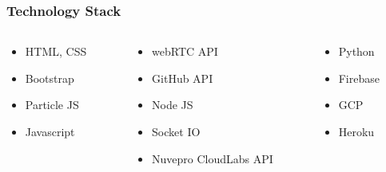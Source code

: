 \documentclass[14pt]{beamer}
\begin{document}
{
\begin{frame}
    \frametitle{\textcolor{whitegray}{Technology Stack}}
    \begin{columns}   
        \begin{column}{0.3\textwidth} 
            \begin{itemize}  
                \item[\textcolor{whitegray}{\textbullet}] {\textcolor{whitegray}{\small HTML, CSS}}
                \item[\textcolor{whitegray}{\textbullet}] {\textcolor{whitegray}{\small Bootstrap}}
                \item[\textcolor{whitegray}{\textbullet}] {\textcolor{whitegray}{\small Particle JS}}
                \item[\textcolor{whitegray}{\textbullet}] {\textcolor{whitegray}{\small Javascript}}            
            \end{itemize}
        \end{column} 
        \begin{column}{0.4\textwidth} 
            \begin{itemize} 
                \item[\textcolor{whitegray}{\textbullet}] {\textcolor{whitegray}{\small webRTC API}}
                \item[\textcolor{whitegray}{\textbullet}] {\textcolor{whitegray}{\small GitHub API}}
                \item[\textcolor{whitegray}{\textbullet}] {\textcolor{whitegray}{\small Node JS}}
                \item[\textcolor{whitegray}{\textbullet}] {\textcolor{whitegray}{\small Socket IO}}        
                \item[\textcolor{whitegray}{\textbullet}] {\textcolor{whitegray}{\small Nuvepro CloudLabs API}}
            \end{itemize}
        \end{column} 
        \begin{column}{0.3\textwidth} 
            \begin{itemize}  
                \item[\textcolor{whitegray}{\textbullet}] {\textcolor{whitegray}{\small Python}}
                \item[\textcolor{whitegray}{\textbullet}] {\textcolor{whitegray}{\small Firebase}}
                \item[\textcolor{whitegray}{\textbullet}] {\textcolor{whitegray}{\small GCP}}
                \item[\textcolor{whitegray}{\textbullet}] {\textcolor{whitegray}{\small Heroku}}                
            \end{itemize}
        \end{column}            
    \end{columns}
\end{frame}
}
\end{document}
